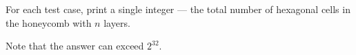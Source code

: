 For each test case, print a single integer --- the total number of hexagonal cells in the honeycomb with $n$ layers.

Note that the answer can exceed $2^{32}$.

